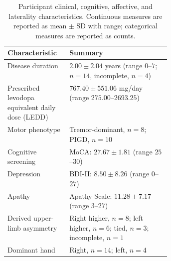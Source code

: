 \documentclass[utf8]{frontiers_suppmat}
\begin{document}
\begin{table}[!htbp]
\centering
\caption{Participant clinical, cognitive, affective, and laterality characteristics. Continuous measures are reported as mean $\pm$ SD with range; categorical measures are reported as counts.}
\label{tab:participant_characteristics}
\renewcommand{\arraystretch}{1.3}
\begin{tabularx}{\linewidth}{@{}>{\raggedright\arraybackslash}p{0.38\linewidth}X@{}}
\toprule
Characteristic & Summary \\
\midrule

Disease duration
& $2.00 \pm 2.04$ years (range $0$--$7$; $n=14$, incomplete, $n=4$) \\

Prescribed levodopa equivalent daily dose (LEDD)
& $767.40 \pm 551.06$ mg/day (range $275.00$--$2693.25$) \\

Motor phenotype
& Tremor-dominant, $n=8$; PIGD, $n=10$ \\

Cognitive screening
& MoCA: $27.67 \pm 1.81$ (range $25$--$30$) \\

Depression
& BDI-II: $8.50 \pm 8.26$ (range $0$--$27$) \\

Apathy
& Apathy Scale: $11.28 \pm 7.17$ (range $3$--$27$) \\

Derived upper-limb asymmetry
& Right higher, $n=8$; left higher, $n=6$; tied, $n=3$; incomplete, $n=1$ \\

Dominant hand
& Right, $n=14$; left, $n=4$ \\

\bottomrule
\end{tabularx}
\end{table}
\end{document}
